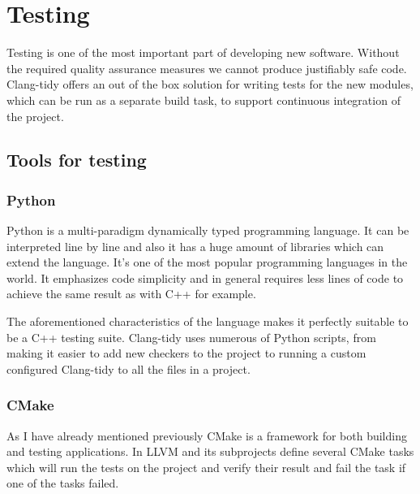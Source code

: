 \section{Testing}
\par Testing is one of the most important part of developing new software. Without the required quality assurance measures we cannot produce justifiably safe code. Clang-tidy offers an out of the box solution for writing tests for the new modules, which can be run as a separate build task, to support continuous integration of the project. 
\subsection{Tools for testing}
\subsubsection{Python}
\par Python is a multi-paradigm dynamically typed programming language. It can be interpreted line by line and also it has a huge amount of libraries which can extend the language. It's one of the most popular programming languages in the world. It emphasizes code simplicity and in general requires less lines of code to achieve the same result as with C++ for example. \medskip
\par The aforementioned characteristics of the language makes it perfectly suitable to be a C++ testing suite. Clang-tidy uses numerous of Python scripts, from making it easier to add new checkers to the project to running a custom configured Clang-tidy to all the files in a project. 
\subsubsection{CMake}
\par As I have already mentioned previously CMake is a framework for both building and testing applications. In LLVM and its subprojects define several CMake tasks which will run the tests on the project and verify their result and fail the task if one of the tasks failed.
